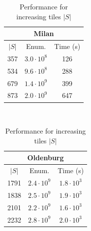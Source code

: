 \documentclass[
]{ceurart}
\renewcommand{\sf}[1]{\textsf{\textup{#1}}}
\begin{document}
\begin{table}[t]
\scriptsize\centering
\caption{Performance for increasing tiles $|S|$}
\label{tab:efftiles}%

\begin{tabular}{ccc}
\multicolumn{3}{c}{\sf{Milan}}\\
\toprule
$|S|$ &        Enum. & Time (s) \\
\midrule
357 &  $3.0\cdot10^{8}$ &      126 \\
534 &  $9.6\cdot10^{8}$ &      288 \\
679 &  $1.4\cdot10^{9}$ &      399 \\
873 &  $2.0\cdot10^{9}$ &      647 \\
\bottomrule
\end{tabular}
~
\begin{tabular}{ccc}
\multicolumn{3}{c}{\sf{Oldenburg}}\\
\toprule
$|S|$ &          Enum. &          Time (s) \\
\midrule
1791 &  $2.4\cdot10^{9}$ &  $1.8\cdot10^{3}$ \\
1838 &  $2.5\cdot10^{9}$ &  $1.9\cdot10^{3}$ \\
2101 &  $2.2\cdot10^{9}$ &  $1.6\cdot10^{3}$ \\
2232 &  $2.8\cdot10^{9}$ &  $2.0\cdot10^{3}$ \\
\bottomrule
\end{tabular}
\end{table}%
\end{document}
